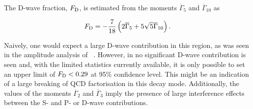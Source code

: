 \noindent
The D-wave fraction, $F_{\rm D}$, is estimated from the moments $\overline{\Gamma}_{5}$ and $\overline{\Gamma}_{10}$ as 

\begin{equation}
F_{\rm D} =  \displaystyle - \frac{7}{18} \left(2 \overline{\Gamma}_{5} + 5 \sqrt{5} \overline{\Gamma}_{10} \right).
\end{equation}

\noindent
Naively, one would expect a large D-wave contribution in this region, as was seen in the amplitude analysis of \BdToJPsiKpi~\cite{belle-z-paper}. However, in \BdToKpimm no significant D-wave contribution is seen and, with the limited statistics currently available, it is only possible to set an upper limit of $F_{\rm D}<0.29$ at 95\% confidence level. This might be an indication of a large breaking of QCD factorisation in this decay mode.  Additionally, the values of the moments $\overline{\Gamma}_{2}$ and $\overline{\Gamma}_{3}$ imply the presence of large interference effects between the S- and P- or D-wave contributions.